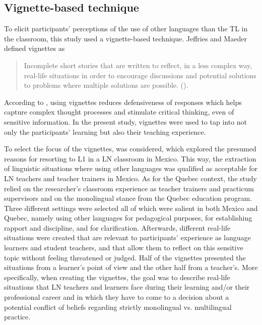 \documentclass[output=paper]{../langscibook}
\begin{document}
\subsection{Vignette-based technique}
To elicit participants’ perceptions of the use of other languages than the TL in the classroom, this study used a vignette-based technique. Jeffries and Maeder defined vignettes as 

\begin{quote}
Incomplete short stories that are written to reflect, in a less complex way, real-life situations in order to encourage discussions and potential solutions to problems where multiple solutions are possible. (\citealt[18]{JeffriesMaeder2005}). 
\end{quote}

According to \citet{SimonTierney2011}, using vignettes reduces defensiveness of responses which helps capture complex thought processes and stimulate critical thinking, even of sensitive information. In the present study, vignettes were used to tap into not only the participants' learning but also their teaching experience. 

To select the focus of the vignettes, \citet{MoraPabloEtAl2011} was considered, which explored the presumed reasons for resorting to L1 in a LN classroom in Mexico. This way, the extraction of linguistic situations where using other languages was qualified as acceptable for LN teachers and teacher trainers in Mexico. As for the Quebec context, the study relied on the researcher’s classroom experience as teacher trainers and practicum supervisors and on the monolingual stance from the Quebec education program. Three different settings were selected all of which were salient in both Mexico and Quebec, namely using other languages for pedagogical purposes, for establishing rapport and discipline, and for clarification. Afterwards, different real-life situations were created that are relevant to participants’ experience as language learners and student teachers, and that allow them to reflect on this sensitive topic without feeling threatened or judged. Half of the vignettes presented the situations from a learner’s point of view and the other half from a teacher’s. More specifically, when creating the vignettes, the goal was to describe real-life situations that LN teachers and learners face during their learning and/or their professional career and in which they have to come to a decision about a potential conflict of beliefs regarding strictly monolingual vs. multilingual practice.
\end{document}

